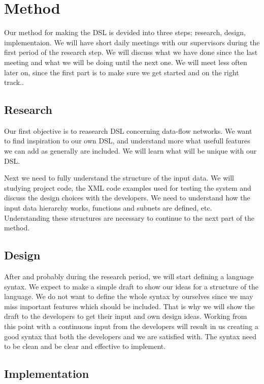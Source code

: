 \documentclass[a4paper]{article}
\begin{document}
\section{Method}
Our method for making the DSL is devided into three steps; research,
design, implementaion. We will have short daily meetings with our
supervisors during the first period of the research step. We will
discuss what we have done since the last meeting and what we will be
doing until the next one. We will meet less often later on, since the
first part is to make sure we get started and on the right track..

\subsection{Research}
Our first objective is to reasearch DSL concerning data-flow
networks. We want to find inspiration to our own DSL, and understand
more what usefull features we can add as generally are included. We
will learn what will be unique with our DSL.

Next we need to fully understand the structure of the input data. We
will studying project code, the XML code examples used for testing the
system and discuss the design choices with the developers. We need to
understand how the input data hierarchy works, functions and subnets
are defined, etc. Understanding these structures are necessary to
continue to the next part of the method.

\subsection{Design}
After and probably during the research period, we will start defining
a language syntax. We expect to make a simple draft to show our ideas
for a structure of the language. We do not want to define the whole
syntax by ourselves since we may miss important features which should
be included. That is why we will show the draft to the developers to
get their input and own design ideas. Working from this point with a
continuous input from the developers will result in us creating a good
syntax that both the developers and we are satisfied with. The syntax
need to be clean and be clear and effective to implement.

\subsection{Implementation}
\end{document}
